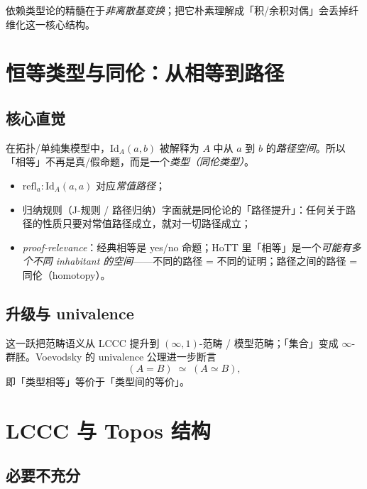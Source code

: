 \documentclass[10pt, openany]{book}
\begin{document}
\begin{principle}[对待依赖类型论的正确姿态]
  依赖类型论的精髓在于\emph{非离散基变换}；把它朴素理解成「积/余积对偶」会丢掉纤维化这一核心结构。
\end{principle}

\chapter{恒等类型与同伦：从相等到路径}

\section{核心直觉}

在拓扑/单纯集模型中，$\mathrm{Id}_A(a,b)$ 被解释为 $A$ 中从 $a$ 到 $b$ 的\emph{路径空间}。所以「相等」不再是真/假命题，而是一个\emph{类型（同伦类型）}。

\begin{definition}[恒等类型的同伦解释]
  \begin{itemize}
    \item $\mathrm{refl}_a : \mathrm{Id}_A(a,a)$ 对应\emph{常值路径}；
    \item 归纳规则（J-规则 / 路径归纳）字面就是同伦论的「路径提升」：任何关于路径的性质只要对常值路径成立，就对一切路径成立；
    \item \emph{proof-relevance}：经典相等是 yes/no 命题；HoTT 里「相等」是一个\emph{可能有多个不同 inhabitant 的空间}——不同的路径 = 不同的证明；路径之间的路径 = 同伦（homotopy）。
  \end{itemize}
\end{definition}

\section{升级与 univalence}

这一跃把范畴语义从 LCCC 提升到 $(\infty,1)$-范畴 / 模型范畴；「集合」变成 $\infty$-群胚。Voevodsky 的 univalence 公理进一步断言
\[
  (A = B) \;\simeq\; (A \simeq B),
\]
即「类型相等」等价于「类型间的等价」。

\chapter{LCCC 与 Topos 结构}

\section{必要不充分}
\end{document}
